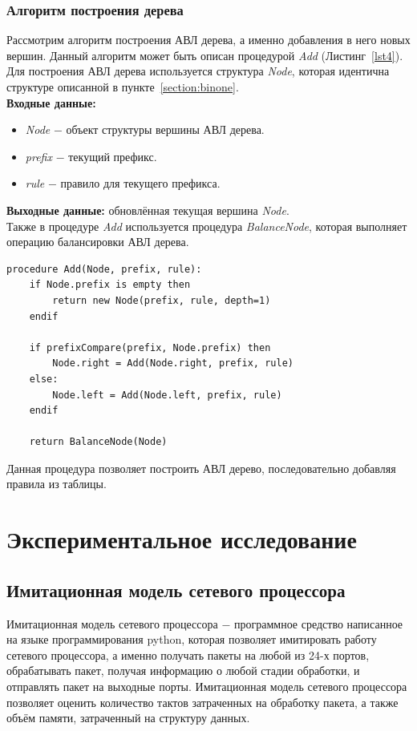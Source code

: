 \documentclass[9pt,a4paper]{article}
\begin{document}
            \subsubsection{Алгоритм построения дерева} 
                Рассмотрим алгоритм построения АВЛ дерева, а именно добавления в него новых вершин. Данный алгоритм может быть описан процедурой \emph{Add} (Листинг~\ref{lst4}).
                Для построения АВЛ дерева используется структура \emph{Node}, которая идентична структуре описанной в пункте~\ref{section:binone}.\\
                {\bf Входные данные:}
                \begin{itemize}
                    \item \emph{Node} $-$ объект структуры вершины АВЛ дерева.
                    \item \emph{prefix} $-$ текущий префикс.
                    \item \emph{rule} $-$ правило для текущего префикса.
                \end{itemize}
                {\bf Выходные данные:} обновлённая текущая вершина \emph{Node}.\\
                Также в процедуре \emph{Add} используется процедура \emph{BalanceNode}, которая выполняет операцию балансировки АВЛ дерева.\\
\begin{lstlisting}[caption=Процедура добавления вершины в АВЛ дерево., label=lst4]
procedure Add(Node, prefix, rule):
    if Node.prefix is empty then
        return new Node(prefix, rule, depth=1)
    endif
    
    if prefixCompare(prefix, Node.prefix) then
        Node.right = Add(Node.right, prefix, rule)
    else:
        Node.left = Add(Node.left, prefix, rule)
    endif
    
    return BalanceNode(Node)
\end{lstlisting}
\vspace{1em}
    Данная процедура позволяет построить АВЛ дерево, последовательно добавляя правила из таблицы.
    \section{Экспериментальное исследование}
    \subsection{Имитационная модель сетевого процессора}
        Имитационная модель сетевого процессора $-$ программное средство написанное на языке программирования python, которая позволяет имитировать работу сетевого процессора, 
        а именно получать пакеты на любой из 24-х портов, обрабатывать пакет, получая информацию о любой стадии обработки, и отправлять пакет на выходные порты.
        Имитационная модель сетевого процессора позволяет оценить количество тактов затраченных на обработку пакета, а также объём памяти, затраченный на структуру данных.
        
\end{document}
